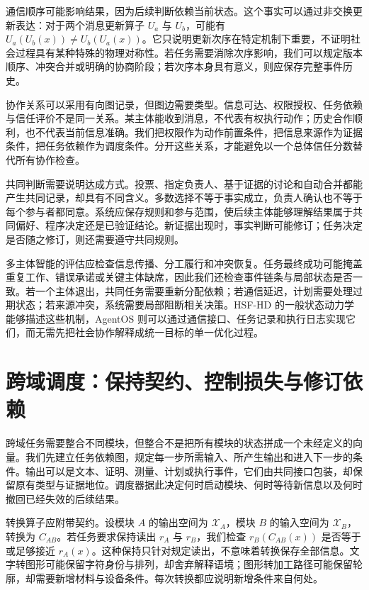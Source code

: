 通信顺序可能影响结果，因为后续判断依赖当前状态。这个事实可以通过非交换更新表达：对于两个消息更新算子 $U_a$ 与 $U_b$，可能有 $U_a(U_b(x))\ne U_b(U_a(x))$。它只说明更新次序在特定机制下重要，不证明社会过程具有某种特殊的物理对称性。若任务需要消除次序影响，我们可以规定版本顺序、冲突合并或明确的协商阶段；若次序本身具有意义，则应保存完整事件历史。

协作关系可以采用有向图记录，但图边需要类型。信息可达、权限授权、任务依赖与信任评价不是同一关系。某主体能收到消息，不代表有权执行动作；历史合作顺利，也不代表当前信息准确。我们把权限作为动作前置条件，把信息来源作为证据条件，把任务依赖作为调度条件。分开这些关系，才能避免以一个总体信任分数替代所有协作检查。

共同判断需要说明达成方式。投票、指定负责人、基于证据的讨论和自动合并都能产生共同记录，却具有不同含义。多数选择不等于事实成立，负责人确认也不等于每个参与者都同意。系统应保存规则和参与范围，使后续主体能够理解结果属于共同偏好、程序决定还是已验证结论。新证据出现时，事实判断可能修订；任务决定是否随之修订，则还需要遵守共同规则。

多主体智能的评估应检查信息传播、分工履行和冲突恢复。任务最终成功可能掩盖重复工作、错误承诺或关键主体缺席，因此我们还检查事件链条与局部状态是否一致。若一个主体退出，共同任务需要重新分配依赖；若通信延迟，计划需要处理过期状态；若来源冲突，系统需要局部阻断相关决策。HSF-HD 的一般状态动力学能够描述这些机制，AgentOS 则可以通过通信接口、任务记录和执行日志实现它们，而无需先把社会协作解释成统一目标的单一优化过程。

\section{跨域调度：保持契约、控制损失与修订依赖}
\label{sec:topological_shapeshifter}

跨域任务需要整合不同模块，但整合不是把所有模块的状态拼成一个未经定义的向量。我们先建立任务依赖图，规定每一步所需输入、所产生输出和进入下一步的条件。输出可以是文本、证明、测量、计划或执行事件，它们由共同接口包装，却保留原有类型与证据地位。调度器据此决定何时启动模块、何时等待新信息以及何时撤回已经失效的后续结果。

转换算子应附带契约。设模块 $A$ 的输出空间为 $\mathcal X_A$，模块 $B$ 的输入空间为 $\mathcal X_B$，转换为 $C_{AB}$。若任务要求保持读出 $r_A$ 与 $r_B$，我们检查 $r_B(C_{AB}(x))$ 是否等于或足够接近 $r_A(x)$。这种保持只针对规定读出，不意味着转换保存全部信息。文字转图形可能保留字符身份与排列，却舍弃解释语境；图形转加工路径可能保留轮廓，却需要新增材料与设备条件。每次转换都应说明新增条件来自何处。

